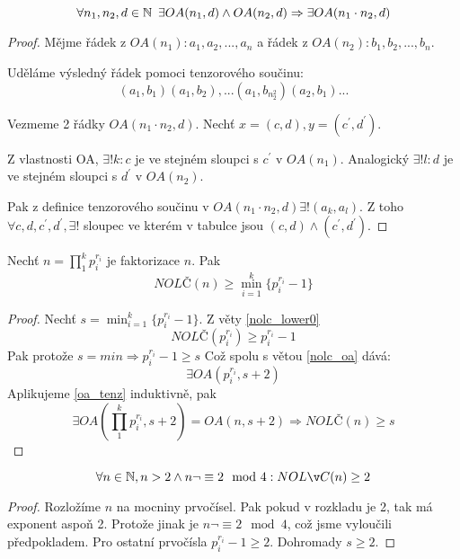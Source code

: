 \begin{theorem}\label{oa_tenz}
	\[ \forall n_1,n_2,d \in \operatorname{\mathbb{N}} \ \exists OA(n_1, d) \land OA(n_2, d) \Rightarrow \exists OA(n_1 \cdot n_2, d) \]
\end{theorem}
\begin{proof}
	Mějme řádek z $OA(n_1): a_1, a_2, ..., a_n$ a řádek z $OA(n_2): b_1, b_2, ..., b_n$.

	Uděláme výsledný řádek pomoci tenzorového součinu:
	\[ (a_1, b_1) (a_1, b_2), ...(a_1, b_{n_2^2})(a_2, b_1) ... \]

	Vezmeme 2 řádky $OA(n_1 \cdot n_2, d)$.
	Nechť $x = (c, d), y = (c^{\prime}, d^{\prime})$.

	Z vlastnosti OA, $\exists! k: c$ je ve stejném sloupci s $c^{\prime}$ v $OA(n_1)$.
	Analogický $\exists! l: d$ je ve stejném sloupci s $d^{\prime}$ v $OA(n_2)$.

	Pak z definice tenzorového součinu v $OA(n_1 \cdot n_2, d) \exists ! (a_k, a_l)$.
	Z toho
	$ \forall c, d, c^{\prime}, d^{\prime}, \exists !$ sloupec ve kterém v tabulce jsou $(c, d) \land (c^{\prime}, d^{\prime})$.
\end{proof}

\begin{theorem}
	Nechť $n = \prod_1^k p_i^{r_i}$ je faktorizace $n$. Pak
	\[ NOLČ(n) \geq \min_{i = 1}^k \{ p_i^{r_i} - 1 \}  \]
\end{theorem}
\begin{proof}
	Nechť $s = \min_{i = 1}^k \{ p_i^{r_i} - 1 \}$.
	Z věty \cref{nolc_lower0}
	\[ NOLČ(p_i^{r_i}) \geq p_i^{r_i} - 1 \]
	Pak protože $s = min \Rightarrow p_i^{r_i} - 1 \geq s$
	Což spolu s větou \cref{nolc_oa} dává:
	\[ \exists OA(p_i^{r_i}, s + 2) \]
	Aplikujeme \cref{oa_tenz} induktivně, pak
	\[ \exists OA(\prod_1^k p_i^{r_i}, s + 2) = OA(n, s + 2) \Rightarrow NOLČ(n) \geq s \]
\end{proof}

\begin{consequence}\label{nolc_lower_1}
	\[ \forall n \in \N, n > 2 \land n \neg \equiv 2 \mod 4: NOLČ(n) \geq 2 \]
\end{consequence}
\begin{proof}
	Rozložíme $n$ na mocniny prvočísel. Pak pokud v rozkladu je 2, tak má exponent aspoň 2.
	Protože jinak je $n \neg \equiv 2 \mod 4$, což jsme vyloučili předpokladem.
	Pro ostatní prvočísla $p_i^{r_i} - 1 \geq 2$.
	Dohromady $s \geq 2$.
\end{proof}

